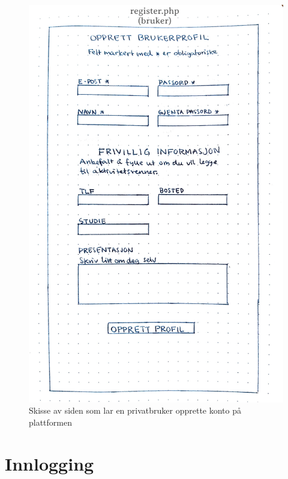 \begin{figure}[H]
\centering
\includegraphics[width=.8\textwidth]{Illustrasjoner/Skisser/1.0/1-17-registering-bruker.jpg}
\caption{Skisse av siden som lar en privatbruker opprette konto på plattformen}
\label{vedlegg:1-17-reg-bruker}
\end{figure}

\section{Innlogging}

